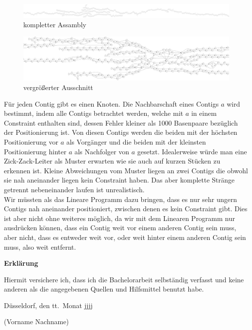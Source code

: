 \documentclass[12pt,ngerman,titlepage,a4paper]{article}
\begin{document}
\begin{figure} 
\includegraphics[width=1\textwidth]{test}
\caption{kompletter Assambly}%
\label{fig:dd}
\end{figure}
\begin{figure} 
\includegraphics[width=1\textwidth]{d33}
\caption{vergrößerter Ausschnitt}%
\label{fig:d3}
\end{figure}

Für jeden Contig gibt es einen Knoten. Die Nachbarschaft eines Contigs $a$ wird bestimmt, indem alle Contigs betrachtet werden, welche mit $a$ in einem Constraint enthalten sind, dessen Fehler kleiner als 1000 Basenpaare bezüglich der Positionierung ist. Von diesen Contigs werden die beiden mit der höchsten Positionierung vor $a$ als Vorgänger und die beiden mit der kleinsten Positionierung hinter $a$ als Nachfolger von $a$ gesetzt. Idealerweise würde man eine Zick-Zack-Leiter als Muster erwarten wie sie auch auf kurzen Stücken zu erkennen ist. Kleine Abweichungen vom Muster liegen an zwei Contigs die obwohl sie nah aneinander liegen kein Constraint haben. Das aber komplette Stränge getrennt nebeneinander laufen ist unrealistisch.\\
Wir müssten als das Lineare Programm dazu bringen, dass es nur sehr ungern Contigs nah aneinander positioniert, zwischen denen es kein Constraint gibt. Dies ist aber nicht ohne weiteres möglich, da wir mit dem Linearen Programm nur ausdrücken können, dass ein Contig weit vor einem anderen Contig sein muss, aber nicht, dass es entweder weit vor, oder weit hinter einem anderen Contig sein muss, also weit entfernt.


\pagebreak\noindent

\textbf{\LARGE Erkl\"arung}

\bigskip\bigskip
\noindent 
Hiermit versichere ich, dass ich die   Bachelorarbeit selbst\"andig verfasst und keine
anderen als die angegebenen Quellen und Hilfsmittel benutzt habe.

\bigskip
\noindent
D\"usseldorf, den tt.\ Monat jjjj

\bigskip\bigskip\bigskip
\noindent
(Vorname Nachname)
\end{document}
